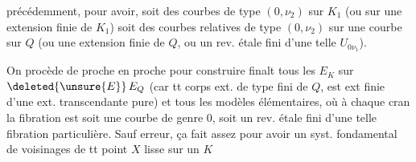 précédemment, pour avoir, soit des courbes de type $(0,\nu_2)$ sur $K_1$\unsure{,} (ou sur une extension finie de $K_1$) soit des courbes relatives de type $(0,\nu_2)$ sur une courbe sur $Q$  (ou une extension finie de $Q$, ou un rev.  étale fini d'une telle $U_{0\nu_1}$).

On procède de proche en proche pour construire finalt tous les $E_K$ sur $\deleted{\unsure{E}}\,E_Q$ (car tt corps ext. de type fini de $Q$, est ext finie d'une ext. transcendante pure) et tous les modèles élémentaires, où à chaque cran la fibration est soit une courbe de genre $0$, soit un rev. étale fini d'une telle fibration particulière. Sauf erreur, ça fait assez pour avoir un syst. fondamental de voisinages de tt point  $X$ lisse sur un $K$

